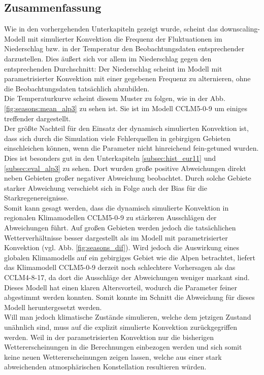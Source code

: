 \subsection{Zusammenfassung}
Wie in den vorhergehenden Unterkapiteln gezeigt wurde, scheint das downscaling-Modell mit simulierter Konvektion die Frequenz der Fluktuationen im Niederschlag bzw. in der Temperatur den Beobachtungsdaten entsprechender darzustellen. Dies äußert sich vor allem im Niederschlag gegen den entsprechenden Durchschnitt: Der Niederschlag scheint im Modell mit parametrisierter Konvektion mit einer gegebenen Frequenz zu alternieren, ohne die Beobachtungsdaten tatsächlich abzubilden.\\
Die Temperaturkurve scheint diesem Muster zu folgen, wie in der Abb.\ref{fig:seasons:mean_alp3} zu sehen ist. Sie ist im Modell CCLM5-0-9 um einiges treffender dargestellt.\\
Der größte Nachteil für den Einsatz der dynamisch simulierten Konvektion ist, dass sich durch die Simulation viele Fehlerquellen in gebirgigen Gebieten einschleichen können, wenn die Parameter nicht hinreichend fein-getuned wurden. Dies ist besonders gut in den Unterkapiteln \ref{subsec:hist_eur11} und \ref{subsec:eval_alp3} zu sehen. Dort wurden große positive Abweichungen direkt neben Gebieten großer negativer Abweichung beobachtet. Durch solche Gebiete starker Abweichung verschiebt sich in Folge auch der Bias für die Starkregenereignisse.\\
Somit kann gesagt werden, dass die dynamisch simulierte Konvektion in regionalen Klimamodellen CCLM5-0-9 zu stärkeren Ausschlägen der Abweichungen führt. Auf großen Gebieten werden jedoch die tatsächlichen Wetterverhältnisse besser dargestellt als im Modell mit parametrisierter Konvektion (vgl. Abb. \ref{fig:seasons_dif}). Wird jedoch die Auswirkung eines globalen Klimamodells auf ein gebirgiges Gebiet wie die Alpen betrachtet, liefert das Klimamodell CCLM5-0-9 derzeit noch schlechtere Vorhersagen als das CCLM4-8-17, da dort die Ausschläge der Abweichungen weniger markant sind. Dieses Modell hat einen klaren Altersvorteil, wodurch die Parameter feiner abgestimmt werden konnten. Somit konnte im Schnitt die Abweichung für dieses Modell heruntergesetzt werden.\\
Will man jedoch klimatische Zustände simulieren, welche dem jetzigen Zustand unähnlich sind, muss auf die explizit simulierte Konvektion zurückgegriffen werden. Weil in der parametrisierten Konvektion nur die bisherigen Wettererscheinungen in die Berechnungen einbezogen werden und sich somit keine neuen Wettererscheinungen zeigen lassen, welche aus einer stark abweichenden atmosphärischen Konstellation resultieren würden.\\

